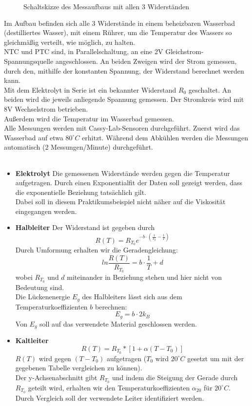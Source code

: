 \documentclass[12pt,a4paper]{article}
\begin{document}
\begin{multicols}{2}
\begin{figure}[H]
	\caption{Schaltskizze des Messaufbaus mit allen 3 Widerständen}
	\label{fig:schaltskizze_temp-widerst}
\end{figure}

Im Aufbau befinden sich alle 3 Widerstände in einem beheizbaren Wasserbad (destilliertes Wasser), mit einem Rührer, um die Temperatur des Wassers so gleichmäßig verteilt, wie möglich, zu halten.\\
NTC und PTC sind, in Parallelschaltung,  an eine 2V Gleichstrom-Spannungsquelle angeschlossen. An beiden Zweigen wird der Strom gemessen, durch den, mithilfe der konstanten Spannung, der Widerstand berechnet werden kann.\\
Mit dem Elektrolyt in Serie ist ein bekannter Widerstand $R_0$ geschaltet. An beiden wird die jeweils anliegende Spannung gemessen. Der Stromkreis wird mit 8V Wechselstrom betrieben.\\
Außerdem wird die Temperatur im Wasserbad gemessen.\\
Alle Messungen werden mit Cassy-Lab-Sensoren durchgeführt. Zuerst wird das Wasserbad auf etwa $80^\circ C$ erhitzt. Während dem Abkühlen werden die Messungen automatisch (2 Messungen/Minute) durchgeführt.\\
\\
\begin{itemize}
	\item \textbf{Elektrolyt}
	Die gemessenen Widerstände werden gegen die Temperatur aufgetragen. Durch einen Exponentialfit der Daten soll gezeigt werden, dass die exponentielle Beziehung tatsächlich gilt.\\
	Dabei soll in diesem Praktikumsbeispiel nicht näher auf die Viskosität eingegangen werden.
	
	\item \textbf{Halbleiter}
	Der Widerstand ist gegeben durch
	$$R(T)=R_{T_0}e^{-b\cdot (\frac{1}{T_0}- \frac{1}{T})}$$
	Durch Umformung erhalten wir die Geradengleichung:
	$$ln{\frac{R(T)}{R_{T_0}}}=b\cdot \frac{1}{T} + d$$
	wobei $R_{T_0}$ und $d$ miteinander in Beziehung stehen und hier nicht von Bedeutung sind.\\
	Die Lückenenergie $E_g$ des Halbleiters lässt sich aus dem Temperaturkoeffizienten $b$ berechnen:
	$$E_g = b \cdot 2k_B$$
	Von $E_g$ soll auf das verwendete Material geschlossen werden.
	
	\item \textbf{Kaltleiter}
	$$R(T) = R_{T_0} * [1+ \alpha (T - T_0)]$$
	$R(T)$ wird gegen $(T-T_0)$ aufgetragen ($T_0$ wird $20^\circ C$ gesetzt um mit der gegebenen Tabelle vergleichen zu können). \\
	Der y-Achsenabschnitt gibt $R_{T_0}$ und indem die Steigung der Gerade durch $R_{T_0}$ geteilt wird, erhalten wir den Temperaturkoeffizienten $\alpha_{20}$ für $20^\circ C$.\\
	Durch Vergleich soll der verwendete Leiter identifiziert werden.\\
	\\
		

\end{itemize}
\end{multicols}
\end{document}
